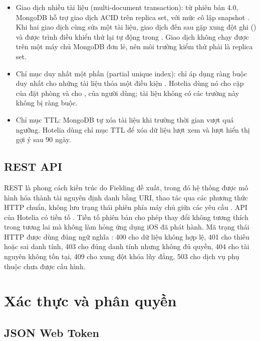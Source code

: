 \begin{itemize}
\item Giao dịch nhiều tài liệu (multi-document transaction): từ phiên bản 4.0, MongoDB hỗ trợ giao dịch ACID trên replica set, với mức cô lập snapshot \cite{mongodbtx}. Khi hai giao dịch cùng sửa một tài liệu, giao dịch đến sau gặp xung đột ghi () và được trình điều khiển thử lại tự động trong . Giao dịch không chạy được trên một máy chủ MongoDB đơn lẻ, nên môi trường kiểm thử phải là replica set.
\item Chỉ mục duy nhất một phần (partial unique index): chỉ áp dụng ràng buộc duy nhất cho những tài liệu thỏa một điều kiện \cite{mongodbindex}. Hotelia dùng nó cho cặp  của đặt phòng và cho ,  của người dùng; tài liệu không có các trường này không bị ràng buộc.
\item Chỉ mục TTL: MongoDB tự xóa tài liệu khi trường thời gian vượt quá ngưỡng. Hotelia dùng chỉ mục TTL để xóa dữ liệu lượt xem và lượt hiển thị gợi ý sau 90 ngày.
\end{itemize}

\subsection{REST API}

REST là phong cách kiến trúc do Fielding đề xuất, trong đó hệ thống được mô hình hóa thành tài nguyên định danh bằng URI, thao tác qua các phương thức HTTP chuẩn, không lưu trạng thái phiên phía máy chủ giữa các yêu cầu \cite{fielding2000}. API của Hotelia có tiền tố . Tiền tố phiên bản cho phép thay đổi không tương thích trong tương lai mà không làm hỏng ứng dụng iOS đã phát hành. Mã trạng thái HTTP được dùng đúng ngữ nghĩa \cite{rfc9110}: 400 cho dữ liệu không hợp lệ, 401 cho thiếu hoặc sai danh tính, 403 cho đúng danh tính nhưng không đủ quyền, 404 cho tài nguyên không tồn tại, 409 cho xung đột khóa lũy đẳng, 503 cho dịch vụ phụ thuộc chưa được cấu hình.

\section{Xác thực và phân quyền}\label{sec:auth-theory}

\subsection{JSON Web Token}


